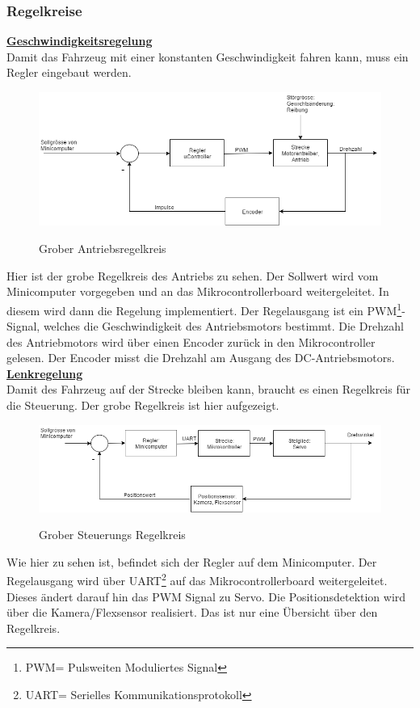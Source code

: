 \subsubsection{Regelkreise}
\underline{\textbf{Geschwindigkeitsregelung}}\\[0.2cm]
Damit das Fahrzeug mit einer konstanten Geschwindigkeit fahren kann, muss ein Regler eingebaut werden.
\begin{figure}[H]
	\centering
	\includegraphics[width=1\textwidth]{03_Loesungskonzept/pictures/Gesch_Regelung.png}
	\label{Regelung_Gesch}
	\caption{Grober Antriebsregelkreis}
\end{figure}\flushleft
Hier ist der grobe Regelkreis des Antriebs zu sehen. Der Sollwert wird vom Minicomputer vorgegeben und an das Mikrocontrollerboard weitergeleitet. In diesem wird dann die Regelung implementiert. Der Regelausgang ist ein PWM\footnote{PWM= Pulsweiten Moduliertes Signal}-Signal, welches die Geschwindigkeit des Antriebsmotors bestimmt. Die Drehzahl des Antriebmotors wird über einen Encoder zurück in den Mikrocontroller gelesen. Der Encoder misst die Drehzahl am Ausgang des DC-Antriebsmotors.\\[0.2cm]
\underline{\textbf{Lenkregelung}}\\[0.2cm]
Damit des Fahrzeug auf der Strecke bleiben kann, braucht es einen Regelkreis für die Steuerung. Der grobe Regelkreis ist hier aufgezeigt.
\begin{figure}[H]
	\centering
	\includegraphics[width=1\textwidth]{03_Loesungskonzept/pictures/Lenk_Regelung.png}
	\label{Regelung_Lenken}
	\caption{Grober Steuerungs Regelkreis }
\end{figure}\flushleft
Wie hier zu sehen ist, befindet sich der Regler auf dem Minicomputer. Der Regelausgang wird über UART\footnote{UART= Serielles Kommunikationsprotokoll} auf das Mikrocontrollerboard weitergeleitet. Dieses ändert darauf hin das PWM Signal zu Servo. Die Positionsdetektion wird über die Kamera/Flexsensor realisiert. Das ist nur eine Übersicht über den Regelkreis.
